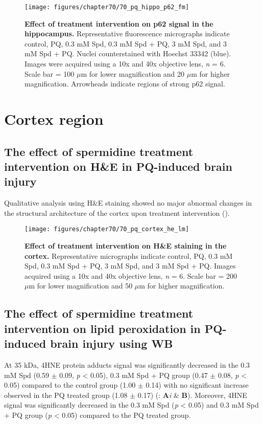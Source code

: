 \begin{landscape}
\begin{figure}[!htbp]
\center
  \texttt{[image: figures/chapter70/70\_pq\_hippo\_p62\_fm]}
  \caption[Effect of treatment intervention on p62 signal in the hippocampus]{\textbf{Effect of treatment intervention on p62 signal in the hippocampus.} Representative fluorescence micrographs indicate control, PQ, 0.3 mM Spd, 0.3 mM Spd + PQ, 3 mM Spd, and 3 mM Spd + PQ. Nuclei counterstained with Hoechst 33342 (blue). Images were acquired using a 10x and 40x objective lens, \textit{n} = 6. Scale bar = 100 $\mu$m for lower magnification and 20 $\mu$m for higher magnification. Arrowheads indicate regions of strong p62 signal.}
  \label{fig:70_pq_hippo_p62_fm}
\end{figure} 
\end{landscape}

\section{Cortex region}
\subsection{The effect of spermidine treatment intervention on H\&E in PQ-induced brain injury}
Qualitative analysis using H\&E staining showed no major abnormal changes in the structural architecture of the cortex upon treatment intervention ().

\begin{figure}[!htbp]
\center
  \texttt{[image: figures/chapter70/70\_pq\_cortex\_he\_lm]}
  \caption[Effect of treatment intervention on H\&E staining in the cortex]{\textbf{Effect of treatment intervention on H\&E staining in the cortex.} Representative micrographs indicate control, PQ, 0.3 mM Spd, 0.3 mM Spd + PQ, 3 mM Spd, and 3 mM Spd + PQ. Images acquired using a 10x and 40x objective lens, \textit{n} = 6. Scale bar = 200 $\mu$m for lower magnification and 50 $\mu$m for higher magnification.}
  \label{fig:70_pq_cortex_he_lm}
\end{figure} 

\subsection{The effect of spermidine treatment intervention on lipid peroxidation in PQ-induced brain injury using WB}
At 35 kDa, 4HNE protein adducts signal was significantly decreased in the 0.3 mM Spd (0.59 $\pm$ 0.09, \textit{p} < 0.05), 0.3 mM Spd + PQ group (0.47 $\pm$ 0.08, \textit{p} < 0.05) compared to the control group (1.00 $\pm$ 0.14) with no significant increase observed in the PQ treated group (1.08 $\pm$ 0.17) (: \textbf{A}\textit{i} \& \textbf{B}). Moreover, 4HNE signal was significantly decreased in the 0.3 mM Spd (\textit{p} < 0.05) and 0.3 mM Spd + PQ group (\textit{p} < 0.05) compared to the PQ treated group. 

